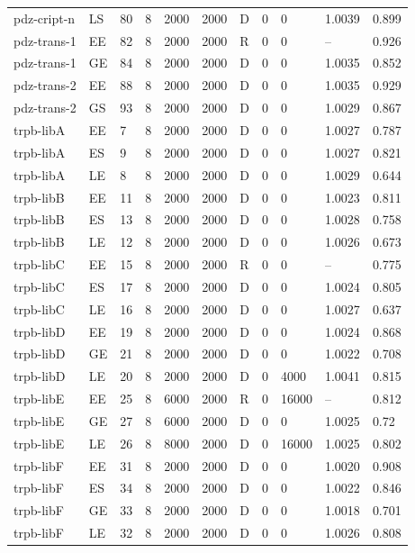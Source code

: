 \begin{longtable}[c]{lllllllllll}
pdz-cript-n & LS & 80 & 8 & 2000 & 2000 & D & 0 & 0 & 1.0039 & 0.899 \\
pdz-trans-1 & EE & 82 & 8 & 2000 & 2000 & R & 0 & 0 & -- & 0.926 \\
pdz-trans-1 & GE & 84 & 8 & 2000 & 2000 & D & 0 & 0 & 1.0035 & 0.852 \\
pdz-trans-2 & EE & 88 & 8 & 2000 & 2000 & D & 0 & 0 & 1.0035 & 0.929 \\
pdz-trans-2 & GS & 93 & 8 & 2000 & 2000 & D & 0 & 0 & 1.0029 & 0.867 \\
trpb-libA & EE & 7 & 8 & 2000 & 2000 & D & 0 & 0 & 1.0027 & 0.787 \\
trpb-libA & ES & 9 & 8 & 2000 & 2000 & D & 0 & 0 & 1.0027 & 0.821 \\
trpb-libA & LE & 8 & 8 & 2000 & 2000 & D & 0 & 0 & 1.0029 & 0.644 \\
trpb-libB & EE & 11 & 8 & 2000 & 2000 & D & 0 & 0 & 1.0023 & 0.811 \\
trpb-libB & ES & 13 & 8 & 2000 & 2000 & D & 0 & 0 & 1.0028 & 0.758 \\
trpb-libB & LE & 12 & 8 & 2000 & 2000 & D & 0 & 0 & 1.0026 & 0.673 \\
trpb-libC & EE & 15 & 8 & 2000 & 2000 & R & 0 & 0 & -- & 0.775 \\
trpb-libC & ES & 17 & 8 & 2000 & 2000 & D & 0 & 0 & 1.0024 & 0.805 \\
trpb-libC & LE & 16 & 8 & 2000 & 2000 & D & 0 & 0 & 1.0027 & 0.637 \\
trpb-libD & EE & 19 & 8 & 2000 & 2000 & D & 0 & 0 & 1.0024 & 0.868 \\
trpb-libD & GE & 21 & 8 & 2000 & 2000 & D & 0 & 0 & 1.0022 & 0.708 \\
trpb-libD & LE & 20 & 8 & 2000 & 2000 & D & 0 & 4000 & 1.0041 & 0.815 \\
trpb-libE & EE & 25 & 8 & 6000 & 2000 & R & 0 & 16000 & -- & 0.812 \\
trpb-libE & GE & 27 & 8 & 6000 & 2000 & D & 0 & 0 & 1.0025 & 0.72 \\
trpb-libE & LE & 26 & 8 & 8000 & 2000 & D & 0 & 16000 & 1.0025 & 0.802 \\
trpb-libF & EE & 31 & 8 & 2000 & 2000 & D & 0 & 0 & 1.0020 & 0.908 \\
trpb-libF & ES & 34 & 8 & 2000 & 2000 & D & 0 & 0 & 1.0022 & 0.846 \\
trpb-libF & GE & 33 & 8 & 2000 & 2000 & D & 0 & 0 & 1.0018 & 0.701 \\
trpb-libF & LE & 32 & 8 & 2000 & 2000 & D & 0 & 0 & 1.0026 & 0.808 \\

\end{longtable}
